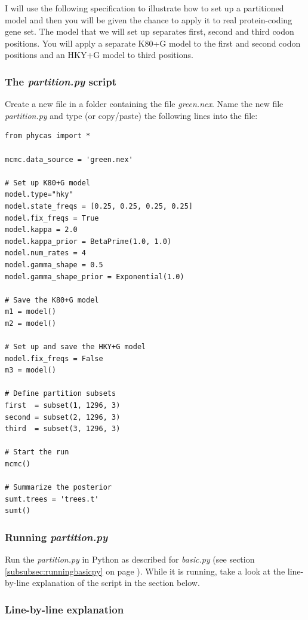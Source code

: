 \documentclass[10pt]{article}
\newcommand{\pathname}[1]{{\em #1}}				%
\begin{document}
I will use the following specification to illustrate how to set up a partitioned model and then you will be given the chance to apply it to real protein-coding gene set. The model that we will set up separates first, second and third codon positions. You will apply a separate K80+G model to the first and second codon positions and an HKY+G model to third positions.

\subsubsection{The {\em partition.py} script}
Create a new file in a folder containing the file \pathname{green.nex}. Name the new file \pathname{partition.py} and type (or copy/paste) the following lines into the file:
\begin{verbatim}
from phycas import *

mcmc.data_source = 'green.nex'

# Set up K80+G model
model.type="hky"
model.state_freqs = [0.25, 0.25, 0.25, 0.25]
model.fix_freqs = True
model.kappa = 2.0
model.kappa_prior = BetaPrime(1.0, 1.0)
model.num_rates = 4
model.gamma_shape = 0.5
model.gamma_shape_prior = Exponential(1.0)

# Save the K80+G model 
m1 = model()
m2 = model()

# Set up and save the HKY+G model
model.fix_freqs = False
m3 = model()

# Define partition subsets
first  = subset(1, 1296, 3)
second = subset(2, 1296, 3)
third  = subset(3, 1296, 3)

# Start the run
mcmc()

# Summarize the posterior
sumt.trees = 'trees.t'
sumt()
\end{verbatim}

\subsubsection{Running \pathname{partition.py}}
Run the \pathname{partition.py} in Python as described for \pathname{basic.py} (see section \ref{subsubsec:runningbasicpy} on page \pageref{subsubsec:runningbasicpy}). While it is running, take a look at the line-by-line explanation of the script in the section below.

\subsubsection{Line-by-line explanation}
\label{subsubsec:partitionpyexplanation}
\end{document}
